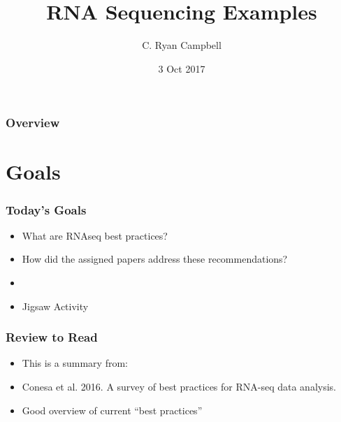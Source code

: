 \documentclass[14pt]{beamer}
\title[RNAseq]{RNA Sequencing Examples} %
\author{C. Ryan Campbell} %
\institute[Duke] %
{
Duke University \\ %
\medskip
\textit{c.ryan.campbell@duke.edu} %
}
\date{3 Oct 2017} %
\begin{document}
\begin{frame}
\titlepage %
\end{frame}

\begin{frame}
\frametitle{Overview} %
\tableofcontents %
\end{frame}


\section{Goals} 

\begin{frame}
\frametitle{Today's Goals}
\begin{itemize}
	\item<+-> What are RNAseq best practices?
	\item<+-> How did the assigned papers address these recommendations?
	\item[]
	\item<+-> Jigsaw Activity
\end{itemize}
\end{frame}

\begin{frame}
\frametitle{Review to Read}
\begin{itemize}
	\item<+-> This is a summary from:
	\item<+-> Conesa et al. 2016. A survey of best practices for RNA-seq data analysis.
	\item<+-> Good overview of current ``best practices''
\end{itemize}
\end{frame}
\end{document}
